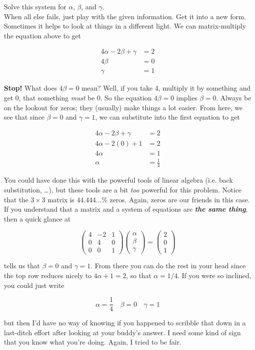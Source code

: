 \documentclass{article}
\def\a{\alpha}
\def\b{\beta}
\def\c{\gamma}
\begin{document}
Solve this system for $\a$, $\b$, and $\c$.\\

When all else fails, just play with the given information. Get it into a new form. Sometimes it helps to look at things in a different light. We can matrix-multiply the equation above to get


\begin{align*}
4 \a - 2 \b + \c &= 2 \\
4 \b &= 0 \\
\c & = 1
\end{align*}

\textbf{Stop!} What does $4 \b = 0$ mean? Well, if you take 4, multiply it by something and get 0, that something \textit{must} be 0. So the equation $4 \b = 0$ implies $\b = 0$. Always be on the lookout for zeros; they (usually) make things a lot easier. From here, we see that since $\b = 0$ and $\c = 1$, we can substitute into the first equation to get

\begin{align*}
4 \a - 2 \b + \c &= 2 \\
4 \a - 2 (0) + 1 &= 2 \\
4 \a &= 1 \\
\a &= \frac{1}{4}
\end{align*}

You could have done this with the powerful tools of linear algebra (i.e. back substitution, \dots ), but these tools are a bit \textit{too} powerful for this problem. Notice that the $3 \times 3$ matrix is $44.444\dots$\% zeros. Again, zeros are our friends in this case. If you understand that a matrix and a system of equations are \textit{\textbf{the same thing}}, then a quick glance at 

\[
\begin{pmatrix} 4 & -2 & 1 \\ 0 & 4 & 0 \\ 0 & 0 & 1 \end{pmatrix} \begin{pmatrix} \a \\ \b \\ \c \end{pmatrix} = \begin{pmatrix} 2 \\ 0 \\ 1 \end{pmatrix}
\]

{\setlength{\parindent}{0cm}
tells us that $\b = 0$ and $\c = 1$. From there you can do the rest in your head since the top row reduces nicely to $4 \a + 1 = 2$, so that $\a = 1/4$. If you were so inclined, you could just write
}

\[
\a = \frac{1}{4} \quad \b = 0 \quad \c = 1
\]

{\setlength{\parindent}{0cm}
but then I'd have no way of knowing if you happened to scribble that down in a last-ditch effort after looking at your buddy's answer. I need some kind of sign that you know what you're doing. Again, I tried to be fair. 
}
\end{document}
